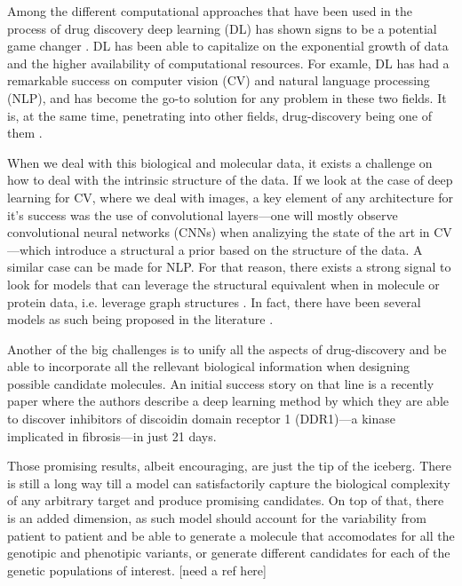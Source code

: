 \documentclass{article}
\begin{document}
Among the different computational approaches that have been used in the process of drug
 discovery deep learning (DL) has shown signs to be a potential game changer
 \cite{Dargan2019}. DL has been able to capitalize on the exponential growth of data and
 the higher availability of computational resources. For examle, DL has had a remarkable
 success on computer vision (CV) and natural language processing (NLP), and has become
 the go-to solution for any problem in these two fields. It is, at the same time,
 penetrating into other fields, drug-discovery being one of them \cite{Chen2018}. 

When we deal with this biological and molecular data, it exists a challenge on how to
 deal with the intrinsic structure of the data.
 If we look at the case of deep learning for CV, where we deal with images, a key
 element of any architecture for it's success was the use of convolutional layers---one
 will mostly observe convolutional neural networks (CNNs) when analizying the state of
 the art in CV---which introduce a structural a prior based on the structure of the
 data. A similar case can be made for NLP. For that reason, there exists a strong signal
 to look for models that can leverage the structural equivalent when in molecule or
 protein data, i.e. leverage graph structures \cite{Wu2019}. In fact, there have been
 several models as such being proposed in the literature \cite{Sun2019}.

Another of the big challenges is to unify all the aspects of drug-discovery and be able
 to incorporate all the rellevant biological information when designing possible
 candidate molecules. An initial success story on that line is a recently paper
 \cite{Zhavoronkov2019} where the authors describe a deep learning method by which they
 are able to discover inhibitors of discoidin domain receptor 1 (DDR1)—a kinase
 implicated in fibrosis—in just 21 days.

Those promising results, albeit encouraging, are just the tip of the iceberg. There is
still a long way till a model can satisfactorily capture the biological complexity of
any arbitrary target and produce promising candidates. On top of that, there is an added
dimension, as such model should account for the variability from patient to patient and
be able to generate a molecule that accomodates for all the genotipic and phenotipic
variants, or generate different candidates for each of the genetic populations of
interest. [need a ref here]
\end{document}
